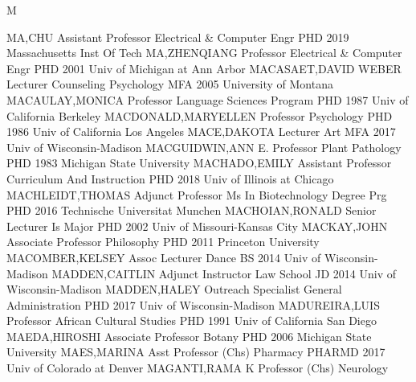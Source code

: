 \documentclass[
]{article}
\begin{document}
M

\textbar{}  \textbar{}

MA,CHU \textbar Assistant Professor \textbar Electrical \& Computer Engr
\textbar PHD 2019 Massachusetts Inst Of Tech \textbar{} 
\textbar MA,ZHENQIANG \textbar Professor \textbar Electrical \& Computer
Engr \textbar PHD 2001 Univ of Michigan at Ann Arbor \textbar{}
 \textbar MACASAET,DAVID WEBER \textbar Lecturer
\textbar Counseling Psychology \textbar MFA 2005 University of Montana
\textbar{}  \textbar MACAULAY,MONICA \textbar Professor
\textbar Language Sciences Program \textbar PHD 1987 Univ of California
Berkeley \textbar{}  \textbar MACDONALD,MARYELLEN
\textbar Professor \textbar Psychology \textbar PHD 1986 Univ of
California Los Angeles \textbar{}  \textbar MACE,DAKOTA
\textbar Lecturer \textbar Art \textbar MFA 2017 Univ of
Wisconsin-Madison \textbar{}  \textbar MACGUIDWIN,ANN E.
\textbar Professor \textbar Plant Pathology \textbar PHD 1983 Michigan
State University \textbar{}  \textbar MACHADO,EMILY
\textbar Assistant Professor \textbar Curriculum And Instruction
\textbar PHD 2018 Univ of Illinois at Chicago \textbar{} 
\textbar MACHLEIDT,THOMAS \textbar Adjunct Professor \textbar Ms In
Biotechnology Degree Prg \textbar PHD 2016 Technische Universitat
Munchen \textbar{}  \textbar MACHOIAN,RONALD \textbar Senior
Lecturer \textbar Is Major \textbar PHD 2002 Univ of Missouri-Kansas
City \textbar{}  \textbar MACKAY,JOHN \textbar Associate
Professor \textbar Philosophy \textbar PHD 2011 Princeton University
\textbar{}  \textbar MACOMBER,KELSEY \textbar Assoc Lecturer
\textbar Dance \textbar BS 2014 Univ of Wisconsin-Madison \textbar{}
 \textbar MADDEN,CAITLIN \textbar Adjunct Instructor
\textbar Law School \textbar JD 2014 Univ of Wisconsin-Madison
\textbar{}  \textbar MADDEN,HALEY \textbar Outreach
Specialist \textbar General Administration \textbar PHD 2017 Univ of
Wisconsin-Madison \textbar{}  \textbar MADUREIRA,LUIS
\textbar Professor \textbar African Cultural Studies \textbar PHD 1991
Univ of California San Diego \textbar{} 
\textbar MAEDA,HIROSHI \textbar Associate Professor \textbar Botany
\textbar PHD 2006 Michigan State University \textbar{} 
\textbar MAES,MARINA \textbar Asst Professor (Chs) \textbar Pharmacy
\textbar PHARMD 2017 Univ of Colorado at Denver \textbar{} 
\textbar MAGANTI,RAMA K \textbar Professor (Chs) \textbar Neurology
\end{document}
